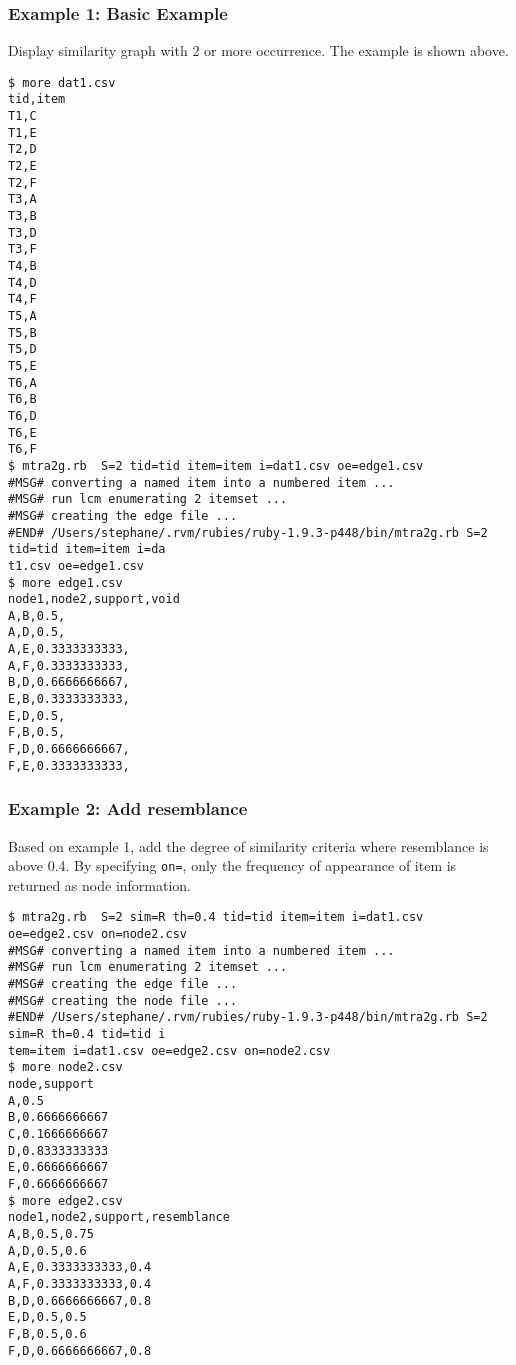 \subsubsection*{Example 1: Basic Example}

Display similarity graph with 2 or more occurrence.
The example is shown above.


\begin{Verbatim}[baselinestretch=0.7,frame=single]
$ more dat1.csv
tid,item
T1,C
T1,E
T2,D
T2,E
T2,F
T3,A
T3,B
T3,D
T3,F
T4,B
T4,D
T4,F
T5,A
T5,B
T5,D
T5,E
T6,A
T6,B
T6,D
T6,E
T6,F
$ mtra2g.rb  S=2 tid=tid item=item i=dat1.csv oe=edge1.csv
#MSG# converting a named item into a numbered item ...
#MSG# run lcm enumerating 2 itemset ...
#MSG# creating the edge file ...
#END# /Users/stephane/.rvm/rubies/ruby-1.9.3-p448/bin/mtra2g.rb S=2 tid=tid item=item i=da
t1.csv oe=edge1.csv
$ more edge1.csv
node1,node2,support,void
A,B,0.5,
A,D,0.5,
A,E,0.3333333333,
A,F,0.3333333333,
B,D,0.6666666667,
E,B,0.3333333333,
E,D,0.5,
F,B,0.5,
F,D,0.6666666667,
F,E,0.3333333333,
\end{Verbatim}
\subsubsection*{Example 2: Add resemblance}

Based on example 1, add the degree of similarity criteria where resemblance is above 0.4.
By specifying \verb|on=|, only the frequency of appearance of item is returned as node information.


\begin{Verbatim}[baselinestretch=0.7,frame=single]
$ mtra2g.rb  S=2 sim=R th=0.4 tid=tid item=item i=dat1.csv oe=edge2.csv on=node2.csv
#MSG# converting a named item into a numbered item ...
#MSG# run lcm enumerating 2 itemset ...
#MSG# creating the edge file ...
#MSG# creating the node file ...
#END# /Users/stephane/.rvm/rubies/ruby-1.9.3-p448/bin/mtra2g.rb S=2 sim=R th=0.4 tid=tid i
tem=item i=dat1.csv oe=edge2.csv on=node2.csv
$ more node2.csv
node,support
A,0.5
B,0.6666666667
C,0.1666666667
D,0.8333333333
E,0.6666666667
F,0.6666666667
$ more edge2.csv
node1,node2,support,resemblance
A,B,0.5,0.75
A,D,0.5,0.6
A,E,0.3333333333,0.4
A,F,0.3333333333,0.4
B,D,0.6666666667,0.8
E,D,0.5,0.5
F,B,0.5,0.6
F,D,0.6666666667,0.8
\end{Verbatim}
